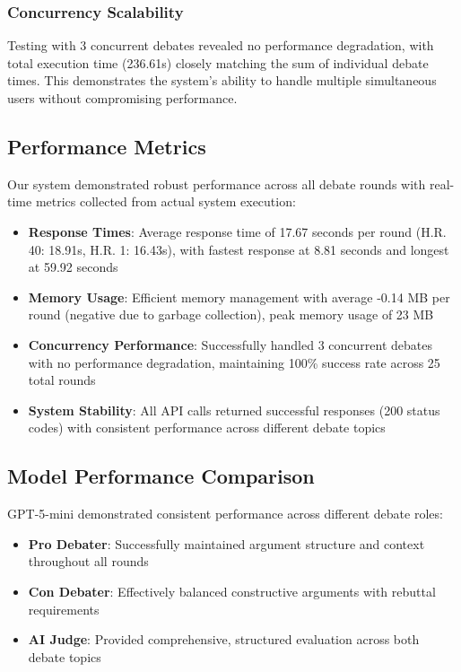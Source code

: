 \documentclass{article}
\begin{document}
\subsubsection{Concurrency Scalability}
Testing with 3 concurrent debates revealed no performance degradation, with total execution time (236.61s) closely matching the sum of individual debate times. This demonstrates the system's ability to handle multiple simultaneous users without compromising performance.

\subsection{Performance Metrics}

Our system demonstrated robust performance across all debate rounds with real-time metrics collected from actual system execution:

\begin{itemize}
    \item \textbf{Response Times}: Average response time of 17.67 seconds per round (H.R. 40: 18.91s, H.R. 1: 16.43s), with fastest response at 8.81 seconds and longest at 59.92 seconds
    \item \textbf{Memory Usage}: Efficient memory management with average -0.14 MB per round (negative due to garbage collection), peak memory usage of 23 MB
    \item \textbf{Concurrency Performance}: Successfully handled 3 concurrent debates with no performance degradation, maintaining 100\% success rate across 25 total rounds
    \item \textbf{System Stability}: All API calls returned successful responses (200 status codes) with consistent performance across different debate topics
\end{itemize}

\subsection{Model Performance Comparison}

GPT-5-mini demonstrated consistent performance across different debate roles:

\begin{itemize}
    \item \textbf{Pro Debater}: Successfully maintained argument structure and context throughout all rounds
    \item \textbf{Con Debater}: Effectively balanced constructive arguments with rebuttal requirements
    \item \textbf{AI Judge}: Provided comprehensive, structured evaluation across both debate topics
\end{itemize}
\end{document}
